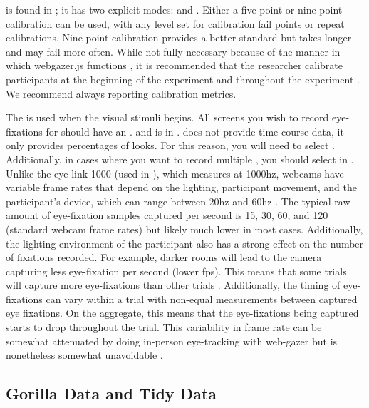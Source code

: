  is found in ; it has two explicit modes:  and . Either a five-point or nine-point calibration can be used, with any level set for calibration fail points or repeat calibrations. Nine-point calibration provides a better standard but takes longer and may fail more often. While not fully necessary because of the manner in which webgazer.js functions \parencite[e.g.,][]{ Chen_et_al_2001}, it is recommended that the researcher calibrate participants at the beginning of the experiment and throughout the experiment \parencite[][]{Prystauka_Altmann_Rothman_2023}. We recommend always reporting calibration metrics.  

The  is used when the visual stimuli begins. All screens you wish to record eye-fixations for should have an .  and  is in .  does not provide time course data, it only provides percentages of looks. For this reason, you will need to select . Additionally, in cases where you want to record multiple , you should select   in  . Unlike the eye-link 1000 (used in \parencite{Porretta_et_al_2020}), which measures at 1000hz, webcams have variable frame rates that depend on the lighting, participant movement, and the participant's device, which can range between 20hz and 60hz \parencite{Vos_2017}. The typical raw amount of eye-fixation samples captured per second is 15, 30, 60, and 120 (standard webcam frame rates) but likely much lower in most cases. Additionally, the lighting environment of the participant also has a strong effect on the number of fixations recorded. For example, darker rooms will lead to the camera capturing less eye-fixation per second (lower fps). This means that some trials will capture more eye-fixations than other trials \parencite{Prystauka_Altmann_Rothman_2023}. Additionally, the timing of eye-fixations can vary within a trial with non-equal measurements between captured eye fixations. On the aggregate, this means that the eye-fixations being captured starts to drop throughout the trial. This variability in frame rate can be somewhat attenuated by doing in-person eye-tracking with web-gazer but is nonetheless somewhat unavoidable \parencite[e.g., ][]{Papoutsaki}. 

\subsection{Gorilla Data and Tidy Data}

